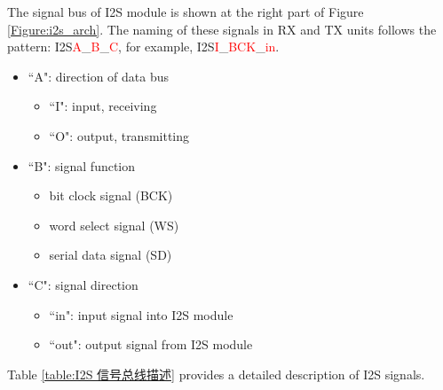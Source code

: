 \documentclass[main\_\_CN.tex]{subfiles}
\begin{document}
The signal bus of I2S module is shown at the right part of Figure  \ref{Figure:i2s_arch}. The naming of these signals in RX and TX units follows the pattern: I2S\textcolor{red}{A}\_\textcolor{red}{B}\_\textcolor{red}{C}, for example, I2S\textcolor{red}{I}\_\textcolor{red}{BCK}\_\textcolor{red}{in}.

\begin{itemize}
    \item ``A": direction of data bus
    \begin{itemize}
        \item ``I": input, receiving
        \item ``O": output, transmitting
    \end{itemize}
    \item ``B": signal function
    \begin{itemize}
        \item bit clock signal (BCK)
        \item word select signal (WS)
        \item serial data signal (SD)
    \end{itemize}
    \item ``C": signal direction
    \begin{itemize}
        \item ``in": input signal into I2S module
        \item ``out": output signal from I2S module
    \end{itemize}
\end{itemize}

Table \ref{table:I2S 信号总线描述} provides a detailed description of I2S signals.
\end{document}
